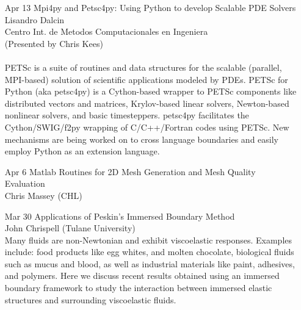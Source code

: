 \documentclass[12]{article}
\begin{document}
\begin{enumerate}
\item[Apr 13]Mpi4py and Petsc4py: Using Python to develop Scalable PDE Solvers\\Lisandro Dalcin\\Centro Int. de Metodos Computacionales en Ingeniera\\(Presented by Chris Kees)\\
\\
PETSc is a suite of routines and data structures for the
scalable (parallel, MPI-based) solution of scientific applications
modeled by PDEs. PETSc for Python (aka petsc4py)
is a Cython-based wrapper to PETSc components like distributed
vectors and matrices, Krylov-based linear solvers,
Newton-based nonlinear solvers, and basic timesteppers.
petsc4py facilitates the Cython/SWIG/f2py wrapping of
C/C++/Fortran codes using PETSc. New mechanisms are
being worked on to cross language boundaries and easily
employ Python as an extension language.

\item[Apr 6]Matlab Routines for 2D Mesh Generation and Mesh Quality Evaluation\\Chris Massey (CHL)\\

\item[Mar 30]Applications of Peskin's Immersed Boundary Method\\ John Chrispell (Tulane University) \\
Many fluids are non-Newtonian and exhibit viscoelastic responses.
Examples include: food products like egg whites, and molten chocolate,
biological
fluids such as mucus and blood, as well as industrial materials like
paint, adhesives, and polymers. Here we discuss recent results obtained
using an immersed boundary framework to study the interaction between
immersed elastic structures and surrounding viscoelastic fluids.


\end{enumerate}
\end{document}
